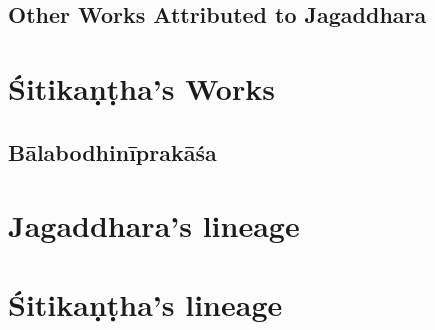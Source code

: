 \subsection{Other Works Attributed to Jagaddhara}

\section{Śitikaṇṭha's Works}

\subsection{Bālabodhinīprakāśa}

\section{Jagaddhara's lineage}

\section{Śitikaṇṭha's lineage}